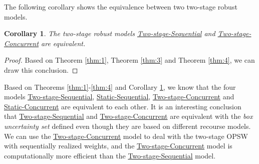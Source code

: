 \documentclass[preprint,review,10pt,round,authoryear]{elsarticle}\usepackage[]{graphicx}\usepackage[]{color}
\theoremstyle{plain}
\newtheorem{cor}{Corollary}
\theoremstyle{definition}
\theoremstyle{remark}
\begin{document}
The following corollary shows the equivalence between two two-stage robust models.
\begin{cor}
\label{cor:1}
The two-stage robust models \hyperref[2ro:1]{Two-stage-Sequential} and \hyperref[2roc:1]{Two-stage-Concurrent} are equivalent.
\end{cor}
\begin{proof}
Based on Theorem \ref{thm:1}, Theorem \ref{thm:3} and Theorem \ref{thm:4}, we can draw this conclusion.
\end{proof}

Based on Theorems \ref{thm:1}-\ref{thm:4} and Corollary \ref{cor:1}, we know that the four models \hyperref[2ro:1]{Two-stage-Sequential}, \hyperref[sro:1]{Static-Sequential}, \hyperref[2roc:1]{Two-stage-Concurrent} and \hyperref[sro:2]{Static-Concurrent} are equivalent to each other. It is an interesting conclusion that \hyperref[2ro:1]{Two-stage-Sequential} and \hyperref[2roc:1]{Two-stage-Concurrent} are equivalent with the \emph{box uncertainty set} defined even though they are based on different recourse models. We can use the \hyperref[2roc:1]{Two-stage-Concurrent} model to deal with the two-stage OPSW with sequentially realized weights, and the \hyperref[2roc:1]{Two-stage-Concurrent} model is computationally more efficient than the \hyperref[2ro:1]{Two-stage-Sequential} model.
\end{document}
